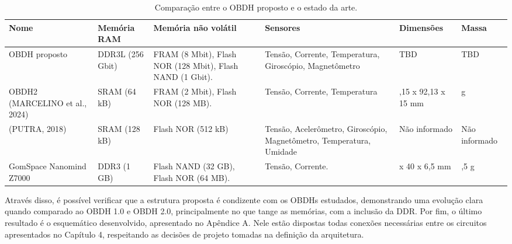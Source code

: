 \begin{table}
\tiny
	\caption{\label{tab:results}Comparação entre o OBDH proposto e o estado da arte.}
    \centering
    \begin{tabular}{@{} >{\centering}p{2cm}>{\centering}p{3cm}>{\centering}p{3cm}>{\centering}p{2cm}>{\centering}p{2cm}>{\centering}p{2cm}@{}}
    
		\toprule
		\textbf{Nome} & \textbf{Memória RAM} & \textbf{Memória não volátil} & \textbf{Sensores} & \textbf{Dimensões} & \textbf{Massa} \tabularnewline 
        \midrule
         OBDH proposto & DDR3L (256 Gbit) & FRAM (8 Mbit), Flash NOR (128 Mbit), Flash NAND (1 Gbit). & Tensão, Corrente, Temperatura, Giroscópio, Magnetômetro & TBD & TBD   \tabularnewline
        \midrule
         OBDH2 (MARCELINO et al., 2024) & SRAM (64 kB) & FRAM (2 Mbit), Flash NOR (128 MB). & Tensão, Corrente, Temperatura & 89,15 x 92,13 x 15 mm & 53 g\tabularnewline
        \midrule
         (PUTRA, 2018) & SRAM (128 kB) & Flash NOR (512 kB) & Tensão, Acelerômetro, Giroscópio, Magnetômetro, Temperatura, Umidade & Não informado & Não informado\tabularnewline
        \midrule
         GomSpace Nanomind Z7000 & DDR3 (1 GB) & Flash NAND (32 GB), Flash NOR (64 MB). & Tensão, Corrente. & 65 x 40 x 6,5 mm & 105,5 g  \tabularnewline
        \bottomrule
	\end{tabular}
\end{table}

Através disso, é possível verificar que a estrutura proposta é condizente com os OBDHs estudados, demonstrando uma evolução clara quando comparado ao OBDH 1.0 e OBDH 2.0, principalmente no que tange as memórias, com a inclusão da DDR. Por fim, o último resultado é o esquemático desenvolvido, apresentado no Apêndice A. Nele estão dispostas todas conexões necessárias entre os circuitos apresentados no Capítulo 4, respeitando as decisões de projeto tomadas na definição da arquitetura. 

